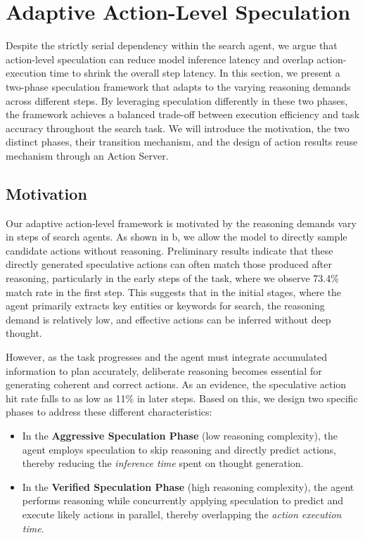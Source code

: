\section{Adaptive Action-Level Speculation}
\label{sec:algo}
Despite the strictly serial dependency within the search agent, we argue that action-level speculation can reduce model inference latency and overlap action-execution time to shrink the overall step latency.
In this section, we present a two-phase speculation framework that adapts to the varying reasoning demands across different steps.
By leveraging speculation differently in these two phases, the framework achieves a balanced trade-off between execution efficiency and task accuracy throughout the search task.
We will introduce the motivation, the two distinct phases, their transition mechanism, and the design of action results reuse mechanism through an Action Server.

\subsection{Motivation}
Our adaptive action-level framework is motivated by the reasoning demands vary in steps of search agents.
As shown in b, we allow the model to directly sample candidate actions without reasoning.
Preliminary results indicate that these directly generated speculative actions can often match those produced after reasoning, particularly in the early steps of the task, where we observe 73.4\% match rate in the first step.
This suggests that in the initial stages, where the agent primarily extracts key entities or keywords for search, the reasoning demand is relatively low, and effective actions can be inferred without deep thought.

However, as the task progresses and the agent must integrate accumulated information to plan accurately, deliberate reasoning becomes essential for generating coherent and correct actions.
As an evidence, the speculative action hit rate falls to as low as 11\% in later steps.
Based on this, we design two specific phases to address these different characteristics:
\begin{itemize}[leftmargin=*]
    \item In the \textbf{Aggressive Speculation Phase} (low reasoning complexity), the agent employs speculation to skip reasoning and directly predict actions, thereby reducing the \textit{inference time} spent on thought generation.
    \item In the \textbf{Verified Speculation Phase} (high reasoning complexity), the agent performs reasoning while concurrently applying speculation to predict and execute likely actions in parallel, thereby overlapping the \textit{action execution time}.
\end{itemize}

